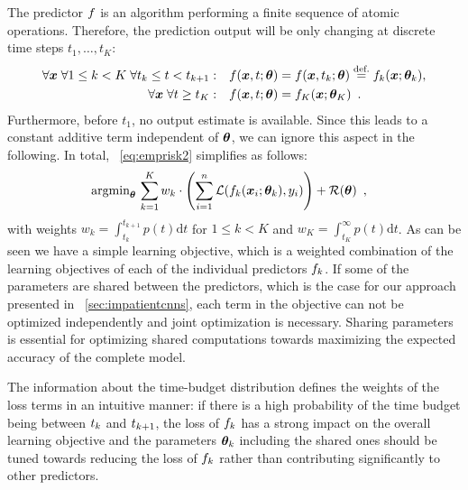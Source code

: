 \documentclass{bmvc2k}
\begin{document}
    The predictor $f$ is an algorithm performing a finite sequence of atomic operations. Therefore, 
    the prediction output will be only changing at discrete time steps $t_1, \ldots, t_K$:
    \begin{align}
        \forall \bm{x} \;\forall 1 \leq k < K\; \forall t_k \leq t < t_{k+1}:\quad& f(\bm{x}, t; \bm{\theta}) = f(\bm{x}, t_k; \bm{\theta}) \stackrel{\text{def.}}{=} f_k(\bm{x}; \bm{\theta}_k),\\
        \forall \bm{x} \; \forall t \geq t_K:\quad& f(\bm{x}, t; \bm{\theta}) = f_K(\bm{x}; \bm{\theta}_K)\enspace.
    \end{align}
    Furthermore, before $t_1$, no output estimate is available. Since this leads to a constant additive term independent
    of $\bm{\theta}$, we can ignore this aspect in the following.
    In total, \equationname~\eqref{eq:emprisk2} simplifies as follows:
    \begin{align}
        \label{eq:emprisk3}
        &\operatorname{\text{argmin}}_{\bm{\theta}}\, \sum\limits_{k=1}^{K} w_k \cdot \left( \sum\limits_{i=1}^{n} 
    \mathcal{L}( f_k(\bm{x}_i; \bm{\theta}_k), y_i ) \right) + \mathcal{R}(\bm{\theta}) \enspace,
    \end{align}
    with weights $w_k = \int_{t_k}^{t_{k+1}} p(t) \mathrm{d}t$ for $1 \leq k < K$ and $w_K = \int_{t_K}^{\infty} p(t) \mathrm{d}t$. 
    As can be seen we have a simple learning objective, which is a weighted combination of the learning objectives of each of the
    individual predictors $f_k$. If some of the parameters are shared between the predictors, which is the case for our approach presented in \sectionname~\ref{sec:impatientcnns}, 
    each term in the objective can not be optimized independently and joint optimization is necessary.
    Sharing parameters is essential for optimizing shared computations towards maximizing the expected accuracy of the complete model.
    
    The information about the time-budget distribution defines the weights of the loss terms in an intuitive manner:
    if there is a high probability of the time budget being between
    $t_{k}$ and $t_{k+1}$, the loss of $f_k$ has a strong impact on the overall learning objective and
    the parameters $\bm{\theta}_k$ including the shared ones should be tuned towards reducing the loss of $f_k$ rather
    than contributing significantly to other predictors. 
\end{document}
